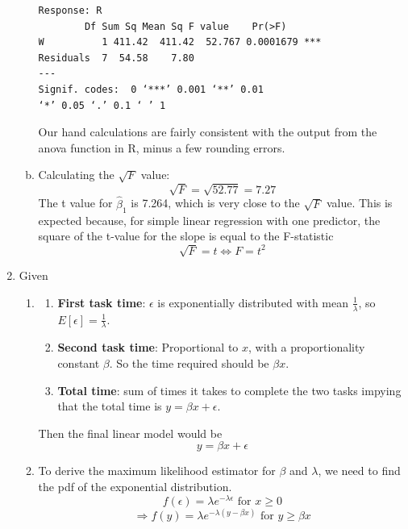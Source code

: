 \documentclass[12pt]{article}
\begin{document}
\begin{enumerate}[1.]
\begin{enumerate}[(a)]
\begin{verbatim}
Response: R
        Df Sum Sq Mean Sq F value    Pr(>F)    
W          1 411.42  411.42  52.767 0.0001679 ***
Residuals  7  54.58    7.80                      
---
Signif. codes:  0 ‘***’ 0.001 ‘**’ 0.01
‘*’ 0.05 ‘.’ 0.1 ‘ ’ 1
            \end{verbatim}
            Our hand calculations are fairly consistent with the output from the anova
            function in R, minus a few rounding errors.
        \item Calculating the $\sqrt{F}$ value:
            \[ \sqrt{F} = \sqrt{52.77} = 7.27 \]
            The t value for $\hat{\beta}_1$ is 7.264, which is very close to the $\sqrt{F}$ 
            value. This is expected because, for simple linear regression with one 
            predictor, the square of the t-value for the slope is equal to the 
            F-statistic 
            \[ \sqrt{F} = t \Leftrightarrow F = t^2 \]
    \end{enumerate}
    
    \item Given
        \begin{enumerate}
            \item 
                \begin{enumerate}[-]
                    \item \textbf{First task time}: $\epsilon$ is 
                    exponentially distributed with mean $ \frac{1}{\lambda} $, so $E[\epsilon] = \frac{1}{\lambda}$.
                    \item \textbf{Second task time}: Proportional to $x$, with a proportionality constant $\beta$. So the time required 
                    should be $\beta x$.
                    \item \textbf{Total time}: sum of times it takes to complete the two tasks
                    impying that the total time is $y = \beta x + \epsilon$.
                \end{enumerate}
            
                Then the final linear model would be 
                \[y = \beta x + \epsilon \]

            \item To derive the maximum likelihood estimator for $\beta$ and $\lambda$, we need to find the pdf of the exponential distribution.
                \[f(\epsilon) = \lambda e^{-\lambda \epsilon} \text{ for } x \geq 0\]
                \[\Rightarrow f(y) = \lambda e^{-\lambda (y - \beta x)} \text{ for } y \geq \beta x\]


\end{enumerate}
\end{enumerate}
\end{document}
